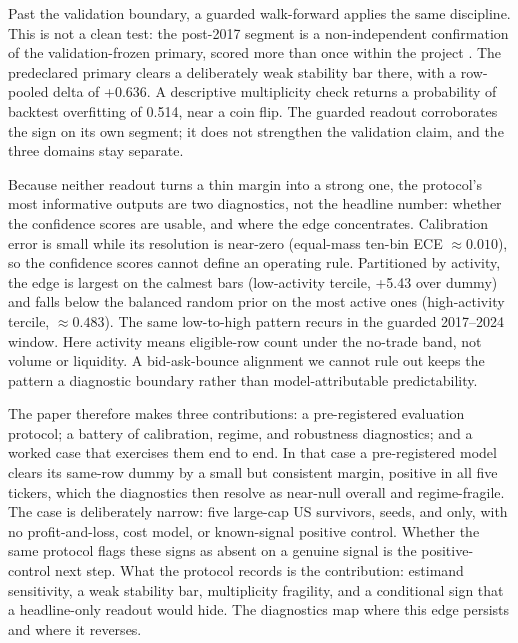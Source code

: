Past the validation boundary, a guarded walk-forward applies the same discipline. This
is not a clean test: the post-2017 segment is a non-independent confirmation of the
validation-frozen primary, scored more than once within the project
\cite{dwork2015reusable}. The predeclared primary clears a deliberately weak stability
bar there, with a row-pooled delta of +0.636\pp{}. A descriptive multiplicity check
returns a probability of backtest overfitting of 0.514, near a coin flip. The guarded
readout corroborates the sign on its own segment; it does not strengthen the validation
claim, and the three domains stay separate.

Because neither readout turns a thin margin into a strong one, the protocol's most
informative outputs are two diagnostics, not the headline number: whether the
confidence scores are usable, and where the edge concentrates. Calibration error is
small while its resolution is near-zero (equal-mass ten-bin ECE \(\approx 0.010\)),
so the confidence scores cannot define an operating rule. Partitioned by activity, the edge
is largest on the calmest bars (low-activity tercile, +5.43\pp{} over dummy) and falls
below the balanced random prior on the most active ones (high-activity tercile,
\macrofone{} \(\approx 0.483\)). The same low-to-high pattern recurs in the guarded
2017--2024 window. Here activity means eligible-row count under the no-trade band, not
volume or liquidity. A bid-ask-bounce alignment we cannot rule out \cite{roll1984simple}
keeps the pattern a diagnostic boundary rather than model-attributable predictability.

The paper therefore makes three contributions: a pre-registered evaluation protocol; a
battery of calibration, regime, and robustness diagnostics; and a worked case that
exercises them end to end. In that case a pre-registered model clears its same-row dummy
by a small but consistent margin, positive in all five tickers, which the diagnostics
then resolve as near-null overall and regime-fragile. The case is deliberately narrow: five large-cap US
survivors, \numseeds{} seeds, and \macrofone{} only, with no profit-and-loss, cost
model, or known-signal positive control. Whether the same protocol flags these signs as
absent on a genuine signal is the positive-control next step. What the protocol records
is the contribution: estimand sensitivity, a weak stability bar, multiplicity fragility,
and a conditional sign that a headline-only readout would hide. The diagnostics map where
this edge persists and where it reverses.
